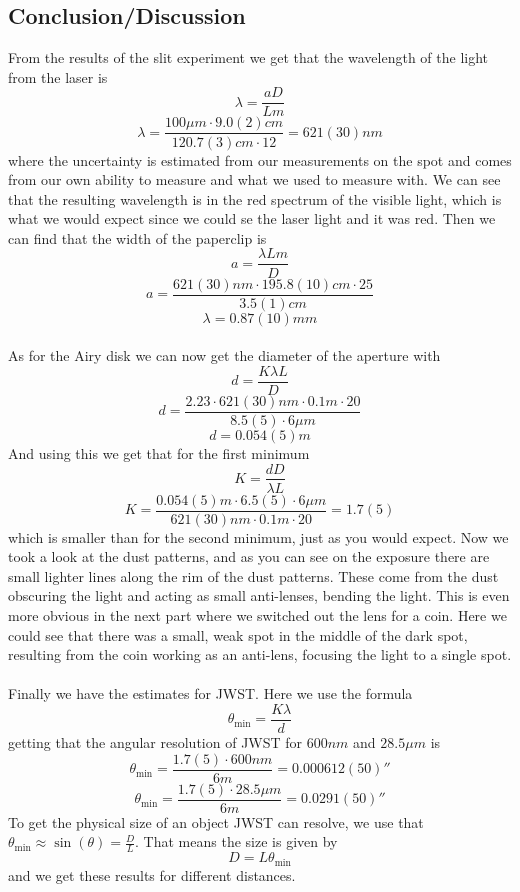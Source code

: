 \documentclass[11pt, A4paper, english]{article}
\begin{document}
	\begin{multicols}{2}
		\section{Conclusion/Discussion}
From the results of the slit experiment we get that the wavelength of the light from the laser is
$$\lambda = \frac{a D}{L m}$$
$$\lambda = \frac{100 \mu m \cdot 9.0(2) cm}{120.7(3) cm \cdot  12} = 621(30) nm$$
where the uncertainty is estimated from our measurements on the spot and comes from our own ability to measure and what we used to measure with. We can see that the resulting wavelength is in the red spectrum of the visible light, which is what we would expect since we could se the laser light and it was red.
Then we can find that the width of the paperclip is
$$a = \frac{\lambda L m}{D}$$
$$a = \frac{621(30) nm \cdot 195.8(10) cm \cdot 25}{3.5(1) cm}$$
$$ \lambda = 0.87(10) mm$$
\\
As for the Airy disk we can now get the diameter of the aperture with
$$d = \frac{K \lambda L}{D}$$
$$d = \frac{2.23 \cdot 621(30) nm \cdot 0.1 m \cdot 20}{8.5(5) \cdot 6 \mu m}$$
$$d = 0.054(5) m$$
And using this we get that for the first minimum
$$K = \frac{d D}{\lambda L}$$
$$K = \frac{0.054(5) m \cdot 6.5(5) \cdot 6 \mu m}{621(30) nm \cdot 0.1 m \cdot 20} = 1.7(5)$$
which is smaller than for the second minimum, just as you would expect. Now we took a look at the dust patterns, and as you can see on the exposure there are small lighter lines along the rim of the dust patterns. These come from the dust obscuring the light and acting as small anti-lenses, bending the light. This is even more obvious in the next part where we switched out the lens for a coin. Here we could see that there was a small, weak spot in the middle of the dark spot, resulting from the coin working as an anti-lens, focusing the light to a single spot. \\
\\
Finally we have the estimates for JWST. Here we use the formula
$$\theta_{\text{min}} = \frac{K \lambda}{d}$$
getting that the angular resolution of JWST for $600 nm$ and $28.5 \mu m$ is
$$\theta_{\text{min}} = \frac{1.7(5) \cdot 600 nm}{6 m} = 0.000612(50)''$$
$$\theta_{\text{min}} = \frac{1.7(5) \cdot 28.5 \mu m}{6 m} = 0.0291(50)''$$
To get the physical size of an object JWST can resolve, we use that $\theta_{\text{min}} \approx \sin(\theta) = \frac{D}{L}$. That means the size is given by
$$D = L \theta_{\text{min}}$$
and we get these results for different distances.
	\end{multicols}
\end{document}
